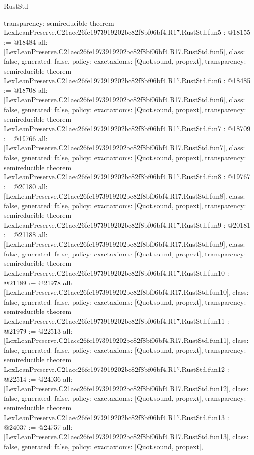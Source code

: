 \begin{lexlean}{RustStd}
\begin{coremodule}
{  transparency: semireducible
}
theorem LexLeanPreserve.C21aec26fe1973919202bc82f8bf06bf4.R17.RustStd.fun5 : @18155 := @18484 {
  all: [LexLeanPreserve.C21aec26fe1973919202bc82f8bf06bf4.R17.RustStd.fun5],
  class: false,
  generated: false,
  policy: exact{axioms: [Quot.sound, propext]},
  transparency: semireducible
}
theorem LexLeanPreserve.C21aec26fe1973919202bc82f8bf06bf4.R17.RustStd.fun6 : @18485 := @18708 {
  all: [LexLeanPreserve.C21aec26fe1973919202bc82f8bf06bf4.R17.RustStd.fun6],
  class: false,
  generated: false,
  policy: exact{axioms: [Quot.sound, propext]},
  transparency: semireducible
}
theorem LexLeanPreserve.C21aec26fe1973919202bc82f8bf06bf4.R17.RustStd.fun7 : @18709 := @19766 {
  all: [LexLeanPreserve.C21aec26fe1973919202bc82f8bf06bf4.R17.RustStd.fun7],
  class: false,
  generated: false,
  policy: exact{axioms: [Quot.sound, propext]},
  transparency: semireducible
}
theorem LexLeanPreserve.C21aec26fe1973919202bc82f8bf06bf4.R17.RustStd.fun8 : @19767 := @20180 {
  all: [LexLeanPreserve.C21aec26fe1973919202bc82f8bf06bf4.R17.RustStd.fun8],
  class: false,
  generated: false,
  policy: exact{axioms: [Quot.sound, propext]},
  transparency: semireducible
}
theorem LexLeanPreserve.C21aec26fe1973919202bc82f8bf06bf4.R17.RustStd.fun9 : @20181 := @21188 {
  all: [LexLeanPreserve.C21aec26fe1973919202bc82f8bf06bf4.R17.RustStd.fun9],
  class: false,
  generated: false,
  policy: exact{axioms: [Quot.sound, propext]},
  transparency: semireducible
}
theorem LexLeanPreserve.C21aec26fe1973919202bc82f8bf06bf4.R17.RustStd.fun10 : @21189 := @21978 {
  all: [LexLeanPreserve.C21aec26fe1973919202bc82f8bf06bf4.R17.RustStd.fun10],
  class: false,
  generated: false,
  policy: exact{axioms: [Quot.sound, propext]},
  transparency: semireducible
}
theorem LexLeanPreserve.C21aec26fe1973919202bc82f8bf06bf4.R17.RustStd.fun11 : @21979 := @22513 {
  all: [LexLeanPreserve.C21aec26fe1973919202bc82f8bf06bf4.R17.RustStd.fun11],
  class: false,
  generated: false,
  policy: exact{axioms: [Quot.sound, propext]},
  transparency: semireducible
}
theorem LexLeanPreserve.C21aec26fe1973919202bc82f8bf06bf4.R17.RustStd.fun12 : @22514 := @24036 {
  all: [LexLeanPreserve.C21aec26fe1973919202bc82f8bf06bf4.R17.RustStd.fun12],
  class: false,
  generated: false,
  policy: exact{axioms: [Quot.sound, propext]},
  transparency: semireducible
}
theorem LexLeanPreserve.C21aec26fe1973919202bc82f8bf06bf4.R17.RustStd.fun13 : @24037 := @24757 {
  all: [LexLeanPreserve.C21aec26fe1973919202bc82f8bf06bf4.R17.RustStd.fun13],
  class: false,
  generated: false,
  policy: exact{axioms: [Quot.sound, propext]},
}
\end{coremodule}
\end{lexlean}
